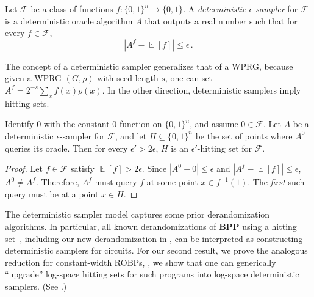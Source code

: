 \documentclass{toc}
\DeclareMathOperator*{\ExpVal}{\mathbb{E}}
\begin{document}
\begin{definition}
Let $\mathcal{F}$ be a class of functions $f \colon \{0, 1\}^n \to \{0, 1\}$. A \emph{deterministic $\epsilon$-sampler} for $\mathcal{F}$ is a deterministic oracle algorithm $A$ that outputs a real number such that for every $f \in \mathcal{F}$,
$$
|A^f - \ExpVal[f]| \leq \epsilon\,.
$$
\end{definition}

The concept of a deterministic sampler generalizes that of a WPRG, because given a WPRG $(G, \rho)$ with seed length $s$, one can set $A^f = 2^{-s} \sum_x f(x) \rho(x)$. In the other direction, deterministic samplers imply hitting sets.

\begin{proposition}
Identify $0$ with the constant $0$ function on $\{0, 1\}^n$, and assume $0 \in \mathcal{F}$. Let $A$ be a deterministic $\epsilon$-sampler for $\mathcal{F}$, and let $H \subseteq \{0, 1\}^n$ be the set of points where $A^0$ queries its oracle. Then for every $\epsilon' > 2\epsilon$, $H$ is an $\epsilon'$-hitting set for $\mathcal{F}$.
\end{proposition}

\begin{proof}
Let $f \in \mathcal{F}$ satisfy $\ExpVal[f] > 2\epsilon$. Since $|A^0 - 0| \leq \epsilon$ and $|A^f - \ExpVal[f]| \leq \epsilon$, $A^0 \neq A^f$. Therefore, $A^f$ must query $f$ at some point $x \in f^{-1}(1)$. The \emph{first} such query must be at a point $x \in H$.
\end{proof}

The deterministic sampler model captures some prior derandomization algorithms. In particular, all known derandomizations of $\mathbf{BPP}$ using a hitting set~\cite{ACR98,BF99,ACRT99,GVW11}, including our new derandomization in , can be interpreted as constructing deterministic samplers for circuits. For our second result, we prove the analogous reduction for constant-width ROBPs, \ie, we show that one can generically ``upgrade'' log-space hitting sets for such programs into log-space deterministic samplers. (See .)
\end{document}
